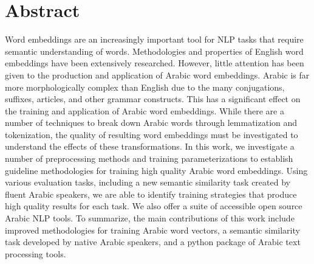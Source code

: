 \section*{Abstract}
\label{sec:abstract}

Word embeddings are an increasingly important tool for NLP tasks that require semantic understanding of words. Methodologies and properties of English word embeddings have been extensively researched. However, little attention has been given to the production and application of Arabic word embeddings. Arabic is far more morphologically complex than English due to the many conjugations, suffixes, articles, and other grammar constructs. This has a significant effect on the training and application of Arabic word embeddings. While there are a number of techniques to break down Arabic words through lemmatization and tokenization, the quality of resulting word embeddings must be investigated to understand the effects of these transformations. In this work, we investigate a number of preprocessing methods and training parameterizations to establish guideline methodologies for training high quality Arabic word embeddings. Using various evaluation tasks, including a new semantic similarity task created by fluent Arabic speakers, we are able to identify training strategies that produce high quality results for each task. We also offer a suite of accessible open source Arabic NLP tools. To summarize, the main contributions of this work include improved methodologies for training Arabic word vectors, a semantic similarity task developed by native Arabic speakers, and a python package of Arabic text processing tools.